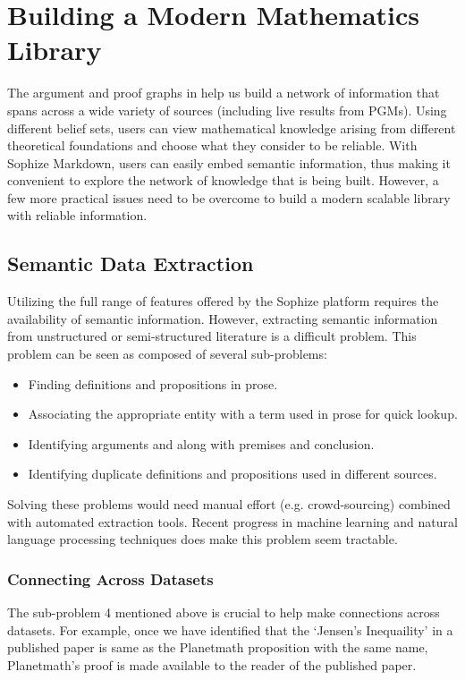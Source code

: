 \documentclass[a4paper]{article}
\begin{document}
\section{Building a Modern Mathematics Library}
The argument and proof graphs in help us build a network of information that spans across a wide variety of sources (including live results from PGMs). Using different belief sets, users can view mathematical knowledge arising from different theoretical foundations and choose what they consider to be reliable. With Sophize Markdown, users can easily embed semantic information, thus making it convenient to explore the network of knowledge that is being built. However, a few more practical issues need to be overcome to build a modern scalable library with reliable information.

\subsection{Semantic Data Extraction}
Utilizing the full range of features offered by the Sophize platform requires the availability of semantic information. However, extracting semantic information from unstructured or semi-structured literature is a difficult problem. This problem can be seen as composed of several sub-problems:
\begin{itemize}
\item Finding definitions and propositions in prose.
\item Associating the appropriate entity with a term used in prose for quick lookup.
\item Identifying arguments and along with premises and conclusion.
\item \label{prob:dup} Identifying duplicate definitions and propositions used in different sources.
\end{itemize}

Solving these problems would need manual effort (e.g. crowd-sourcing) combined with automated extraction tools. Recent progress in machine learning and natural language processing techniques does make this problem seem tractable.

\subsubsection{}


\subsubsection{Connecting Across Datasets}
The sub-problem 4 mentioned above is crucial to help make connections across datasets. For example, once we have identified that the `Jensen's Inequaility' in a published paper is same as the Planetmath proposition with the same name, Planetmath's proof is made available to the reader of the published paper. 
\end{document}
